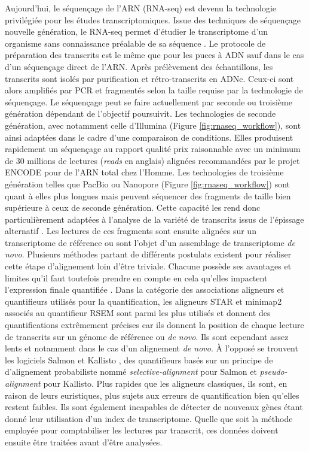 Aujourd'hui, le séquençage de l'ARN (RNA-seq) est devenu la technologie privilégiée pour les études transcriptomiques. Issue des techniques de séquençage nouvelle génération, le RNA-seq permet d'étudier le transcriptome d'un organisme sans connaissance préalable de sa séquence \cite{Wang2009Jan}. Le protocole de préparation des transcrits est le même que pour les puces à ADN sauf dans le cas d'un séquençage direct de l'ARN. Après prélèvement des échantillons, les transcrits sont isolés par purification et rétro-transcrits en ADNc. Ceux-ci sont alors amplifiés par PCR et fragmentés selon la taille requise par la technologie de séquençage. Le séquençage peut se faire actuellement par seconde ou troisième génération dépendant de l'objectif poursuivit. Les technologies de seconde génération, avec notamment celle d'Illumina (Figure \ref{fig:rnaseq_workflow}), sont ainsi adaptées dans le cadre d'une comparaison de conditions. Elles produisent rapidement un séquençage au rapport qualité prix raisonnable avec un minimum de 30 millions de lectures (\textit{reads} en anglais) alignées recommandées par le projet ENCODE \cite{ENCODE2012} pour de l'ARN total chez l'Homme. Les technologies de troisième génération telles que PacBio ou Nanopore (Figure \ref{fig:rnaseq_workflow}) sont quant à elles plus longues mais peuvent séquencer des fragments de taille bien supérieure à ceux de seconde génération. Cette capacité les rend donc particulièrement adaptées à l'analyse de la variété de transcrits issus de l'épissage alternatif \cite{Bergsma2018Jan}. Les lectures de ces fragments sont ensuite alignées sur un transcriptome de référence ou sont l'objet d'un assemblage de transcriptome \textit{de novo}. Plusieurs méthodes partant de différents postulats existent pour réaliser cette étape d'alignement loin d'être triviale. Chacune possède ses avantages et limites qu'il faut toutefois prendre en compte en cela qu'elles impactent l'expression finale quantifiée \cite{Yi2018Oct,Srivastava2020Dec}. Dans la catégorie des associations aligneurs et quantifieurs utilisés pour la quantification, les aligneurs STAR \cite{Dobin2013Jan} et minimap2 \cite{Li2018Sep} associés au quantifieur RSEM \cite{Li2011Dec} sont parmi les plus utilisés et donnent des quantifications extrêmement précises car ils donnent la position de chaque lecture de transcrits sur un génome de référence ou \textit{de novo}. Ils sont cependant assez lents et notamment dans le cas d'un alignement \textit{de novo}. À l'opposé se trouvent les logiciels Salmon \cite{Patro2017Apr} et Kallisto \cite{Bray2016May}, des quantifieurs basés sur un principe de d'alignement probabiliste nommé \textit{selective-alignment} pour Salmon et \textit{pseudo-alignment} pour Kallisto. Plus rapides que les aligneurs classiques, ils sont, en raison de leurs euristiques, plus sujets aux erreurs de quantification bien qu'elles restent faibles. Ils sont également incapables de détecter de nouveaux gènes étant donné leur utilisation d'un index de transcriptome. Quelle que soit la méthode employée pour comptabiliser les lectures par transcrit, ces données doivent ensuite être traitées avant d'être analysées.


